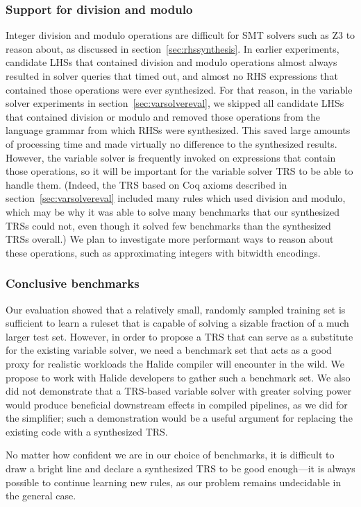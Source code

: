 \subsubsection{Support for division and modulo}
Integer division and modulo operations are difficult for SMT solvers such as Z3 to reason about, as discussed in section~\ref{sec:rhssynthesis}. In earlier experiments, candidate LHSs that contained division and modulo operations almost always resulted in solver queries that timed out, and almost no RHS expressions that contained those operations were ever synthesized. For that reason, in the variable solver experiments in section~\ref{sec:varsolvereval}, we skipped all candidate LHSs that contained division or modulo and removed those operations from the language grammar from which RHSs were synthesized. This saved large amounts of processing time and made virtually no difference to the synthesized results. However, the variable solver is frequently invoked on expressions that contain those operations, so it will be important for the variable solver TRS to be able to handle them. (Indeed, the TRS based on Coq axioms described in section~\ref{sec:varsolvereval} included many rules which used division and modulo, which may be why it was able to solve many benchmarks that our synthesized TRSs could not, even though it solved few benchmarks than the synthesized TRSs overall.) We plan to investigate more performant ways to reason about these operations, such as approximating integers with bitwidth encodings.

\subsubsection{Conclusive benchmarks}
Our evaluation showed that a relatively small, randomly sampled training set is sufficient to learn a ruleset that is capable of solving a sizable fraction of a much larger test set. However, in order to propose a TRS that can serve as a substitute for the existing variable solver, we need a benchmark set that acts as a good proxy for realistic workloads the Halide compiler will encounter in the wild. We propose to work with Halide developers to gather such a benchmark set. We also did not demonstrate that a TRS-based variable solver with greater solving power would produce beneficial downstream effects in compiled pipelines, as we did for the simplifier; such a demonstration would be a useful argument for replacing the existing code with a synthesized TRS.

No matter how confident we are in our choice of benchmarks, it is difficult to draw a bright line and declare a synthesized TRS to be good enough---it is always possible to continue learning new rules, as our problem remains undecidable in the general case. 

